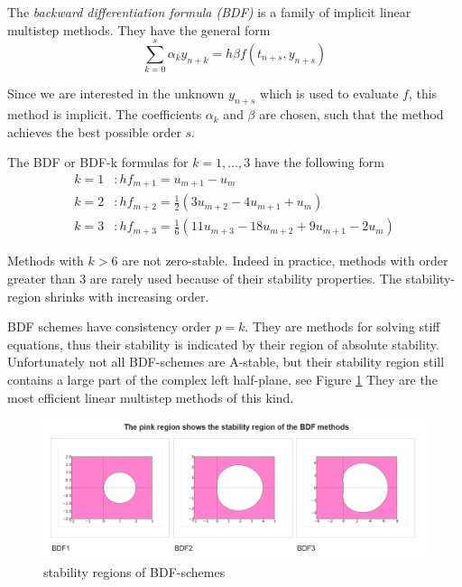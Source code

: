	The \emph{backward differentiation formula (BDF)} is a family of implicit linear multistep methods. They have the general form
	\begin{equation}
		\sum_{k=0}^{s} \alpha_k y_{n+k} = h \beta f(t_{n+s}, y_{n+s})
	\end{equation}

	Since we are interested in the unknown $y_{n+s}$ which is used to evaluate $f$, this method is implicit. The coefficients $\alpha_k$ and $\beta$ are chosen, such that the method achieves the best possible order $s$.
	
	The BDF or BDF-k formulas for $k=1,...,3$ have the following form %
	\begin{align*}
		k = 1 &: h f_{m+1} = u_{m+1} - u_m \\
		k = 2 &: h f_{m+2} = \frac{1}{2} (3 u_{m+2} - 4 u_{m+1} + u_m) \\
		k = 3 &: h f_{m+3} = \frac{1}{6} (11 u_{m+3} - 18 u_{m+2} + 9 u_{m+1} - 2 u_m) %
	\end{align*}
	
	Methods with $k > 6$ are not zero-stable. Indeed in practice, methods with order greater than 3 are rarely used because of their stability properties. The stability-region shrinks with increasing order.
	
	BDF schemes have consistency order $p = k$. They are methods for solving stiff equations, thus their stability is indicated by their region of absolute stability. Unfortunately not all BDF-schemes are A-stable, but their stability region still contains a large part of the complex left half-plane, see Figure \ref{fig:screenshot020} They are the most efficient linear multistep methods of this kind.
	
	\begin{figure}[H]
		\centering
		\includegraphics[width=0.7\linewidth]{screenshot020}
		\caption{stability regions of BDF-schemes}
		\label{fig:screenshot020}
	\end{figure}
	
